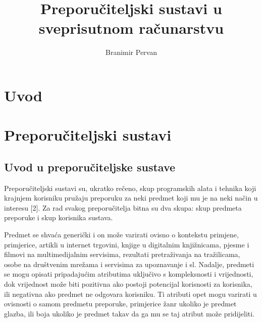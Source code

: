 \documentclass[times, utf8, diplomski]{fer}
\begin{document}

\title{Preporučiteljski sustavi u sveprisutnom računarstvu}

\author{Branimir Pervan}

\maketitle

\izvornik


\tableofcontents

\chapter{Uvod}


\chapter{Preporučiteljski sustavi}
\section{Uvod u preporučiteljske sustave}
Preporučiteljski sustavi su, ukratko rečeno, skup programskih alata i tehnika
koji krajnjem korisniku pružaju preporuku za neki predmet koji mu je na neki
način u interesu [2]. Za rad svakog preporučitelja bitna su dva skupa: skup
predmeta preporuke i skup korisnika sustava.

Predmet se shvaća generički i on može varirati ovisno o kontekstu primjene,
primjerice, artikli u internet trgovini, knjige u digitalnim knjižnicama, pjesme
i filmovi na multimedijalnim servisima, rezultati pretraživanja na tražilicama,
osobe na društvenim mrežama i servisima za upoznavanje i sl. Nadalje, predmeti
se mogu opisati pripadajućim atributima uključivo s kompleksnosti i vrijednosti,
dok vrijednost može biti pozitivna ako postoji potencijal korisnosti za
korisnika, ili negativna ako predmet ne odgovara korisniku. Ti atributi opet mogu 
varirati u ovisnosti o samom predmetu preporuke, primjerice žanr ukoliko je predmet 
glazba, ili boja ukoliko je predmet takav da ga mu se taj atribut može pridijeliti.
\end{document}
